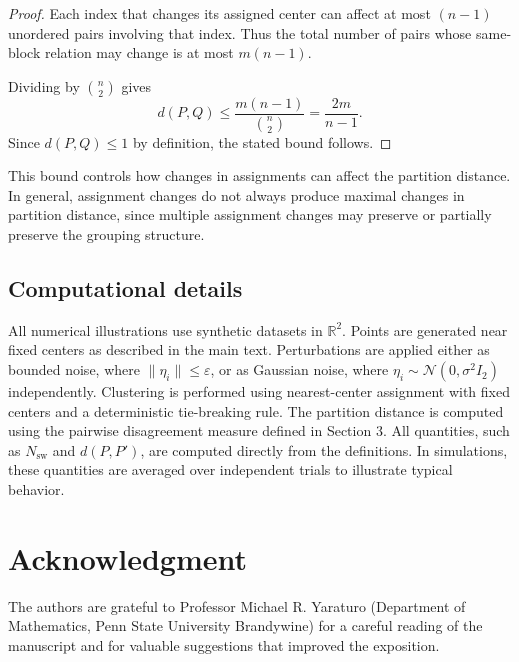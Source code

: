 \documentclass[11pt]{amsart}
\theoremstyle{plain}
\theoremstyle{definition}
\begin{document}
\begin{proof}
Each index that changes its assigned center can affect at most $(n-1)$ unordered pairs involving that index. Thus the total number of pairs whose same-block relation may change is at most $m(n-1)$.

Dividing by $\binom{n}{2}$ gives
\[
d(P,Q) \le \frac{m(n-1)}{\binom{n}{2}} = \frac{2m}{n-1}.
\]
Since $d(P,Q) \le 1$ by definition, the stated bound follows.
\end{proof}

This bound controls how changes in assignments can affect the partition distance. In general, assignment changes do not always produce maximal changes in partition distance, since multiple assignment changes may preserve or partially preserve the grouping structure.

\subsection{Computational details}

All numerical illustrations use synthetic datasets in $\mathbb{R}^2$. Points are generated near fixed centers as described in the main text. Perturbations are applied either as bounded noise, where $\|\eta_i\| \le \varepsilon$, or as Gaussian noise, where $\eta_i \sim \mathcal{N}(0,\sigma^2 I_2)$ independently. Clustering is performed using nearest-center assignment with fixed centers and a deterministic tie-breaking rule. The partition distance is computed using the pairwise disagreement measure defined in Section 3. All quantities, such as $N_{\mathrm{sw}}$ and $d(P,P')$, are computed directly from the definitions. In simulations, these quantities are averaged over independent trials to illustrate typical behavior.

\section*{Acknowledgment}
The authors are grateful to Professor Michael R. Yaraturo (Department of Mathematics, Penn State University Brandywine) for a careful reading of the manuscript and for valuable suggestions that improved the exposition.
\end{document}
